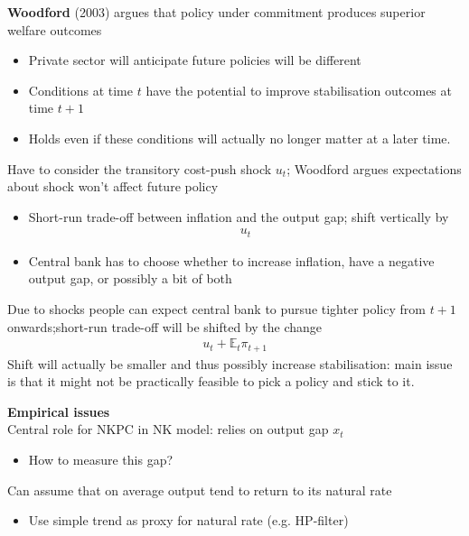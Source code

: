 \documentclass{beamer}
\begin{document}
\begin{frame}
  \textbf{Woodford} (2003) argues that policy under commitment produces superior welfare outcomes
  \begin{itemize}
    \item Private sector will anticipate future policies will be different
    \item Conditions at time $t$ have the potential to improve stabilisation outcomes at time $t+1$
    \item Holds even if these conditions will actually no longer matter at a later time. 
  \end{itemize}
\end{frame}

\begin{frame}
  Have to consider the transitory cost-push shock $u_t$; Woodford argues expectations about shock won't affect future policy
  \begin{itemize}
    \item Short-run trade-off between inflation and the output gap; shift vertically by
    \begin{align}
       u_t
     \end{align} 
    \item Central bank has to choose whether to increase inflation, have a negative output gap, or possibly a bit of both
  \end{itemize}
  Due to shocks people can expect central bank to pursue tighter policy from $t+1$ onwards;short-run trade-off will be shifted by the change 
  \begin{align}
   u_t+\mathbb{E}_t\pi_{t+1} 
  \end{align}
  Shift will actually be smaller and thus possibly increase stabilisation: main issue is that it might not be practically feasible to pick a policy and stick to it.   
\end{frame}

\begin{frame}
  \textbf{Empirical issues}\\
  Central role for NKPC in NK model: relies on output gap $x_t$
  \begin{itemize}
    \item How to measure this gap?
  \end{itemize}
  \medskip
  Can assume that on average output tend to return to its natural rate
 \begin{itemize}
   \item Use simple trend as proxy for natural rate (e.g. HP-filter)
 \end{itemize}
\end{frame}
\end{document}
